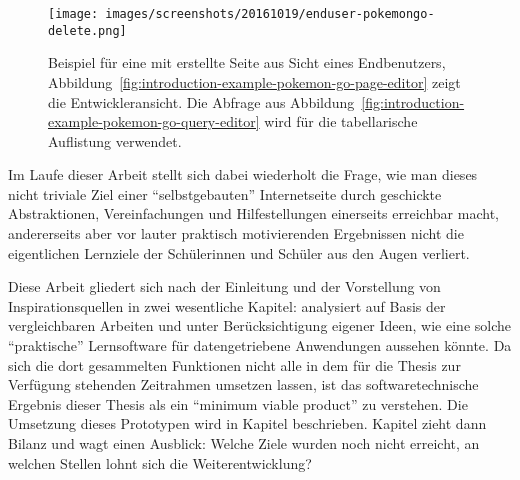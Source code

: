 \begin{figure}[p]
  \texttt{[image: images/screenshots/20161019/enduser-pokemongo-delete.png]}
  \caption{Beispiel für eine mit \idename{} erstellte Seite aus Sicht eines Endbenutzers,  Abbildung~\ref{fig:introduction-example-pokemon-go-page-editor} zeigt die Entwickleransicht. Die Abfrage aus Abbildung~\ref{fig:introduction-example-pokemon-go-query-editor} wird für die tabellarische Auflistung verwendet.}
  \label{fig:introduction-example-pokemon-go-catch}
\end{figure}

Im Laufe dieser Arbeit stellt sich dabei wiederholt die Frage, wie man dieses nicht triviale Ziel einer "`selbstgebauten"' Internetseite durch geschickte Abstraktionen, Vereinfachungen und Hilfestellungen einerseits erreichbar macht, andererseits aber vor lauter praktisch motivierenden Ergebnissen nicht die eigentlichen Lernziele der Schülerinnen und Schüler aus den Augen verliert.

Diese Arbeit gliedert sich nach der Einleitung und der Vorstellung von Inspirationsquellen in zwei wesentliche Kapitel:  analysiert auf Basis der vergleichbaren Arbeiten und unter Berücksichtigung eigener Ideen, wie eine solche "`praktische"' Lernsoftware für datengetriebene Anwendungen aussehen könnte. Da sich die dort gesammelten Funktionen nicht alle in dem für die Thesis zur Verfügung stehenden Zeitrahmen umsetzen lassen, ist das softwaretechnische Ergebnis dieser Thesis als ein "`minimum viable product"' zu verstehen. Die Umsetzung dieses Prototypen wird in Kapitel  beschrieben. Kapitel  zieht dann Bilanz und wagt einen Ausblick: Welche Ziele wurden noch nicht erreicht, an welchen Stellen lohnt sich die Weiterentwicklung?

